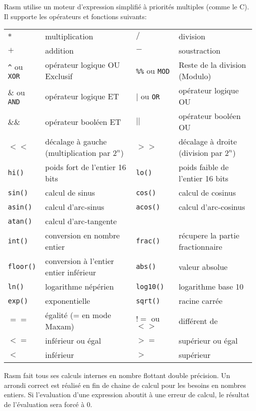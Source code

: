 \begin{xfr}
  Rasm utilise un moteur d'expression simplifié à priorités multiples (comme le C). Il supporte les opérateurs et fonctions suivants:

\begin{tabular}{ll|ll}
$*$ & multiplication &
$/$ & division \\
$+$ & addition &
$-$ & soustraction \\

\texttt{\^}  ou \texttt{XOR} & opérateur logique OU Exclusif &
\texttt{\%\%} ou \texttt{MOD} & Reste de la division (Modulo) \\

\& ou \texttt{AND} & opérateur logique ET &
$|$ ou \texttt{OR} & opérateur logique OU \\
\&\& & opérateur booléen ET &
$||$ & opérateur booléen OU \\
$<<$ & décalage à gauche (multiplication par $2^n$) &
$>>$ & décalage à droite (division par $2^n$) \\


\texttt{hi()} & poids fort de l'entier 16 bits &
\texttt{lo()} & poids faible de l'entier 16 bits \\

\texttt{sin()} & calcul de sinus &
\texttt{cos()} & calcul de cosinus \\
\texttt{asin()} & calcul d'arc-sinus &
\texttt{acos()} & calcul d'arc-cosinus \\

\texttt{atan()} & calcul d'arc-tangente &
& \\
\texttt{int()} & conversion en nombre entier &
\texttt{frac()} & récupere la partie fractionnaire  \\
\texttt{floor()} & conversion à l'entier entier inférieur &
\texttt{abs()} & valeur absolue \\


\texttt{ln()} & logarithme népérien &
\texttt{log10()} & logarithme base 10 \\
\texttt{exp()} & exponentielle &
\texttt{sqrt()} & racine carrée \\

\texttt{$==$} & égalité (= en mode Maxam) &
\texttt{$!=$} ou \texttt{$<>$} & différent de \\
\texttt{$<=$} & inférieur ou égal &
\texttt{$>=$} & supérieur ou égal \\
\texttt{$<$} & inférieur &
\texttt{$>$} & supérieur \\

\end{tabular}

\medskip
Rasm fait tous ses calculs internes en nombre flottant double précision.
Un arrondi correct est réalisé en fin de chaine de calcul pour les besoins en nombres entiers.
Si l'evaluation d'une expression aboutit à une erreur de calcul, le résultat de l'évaluation sera forcé à 0.
\end{xfr}

